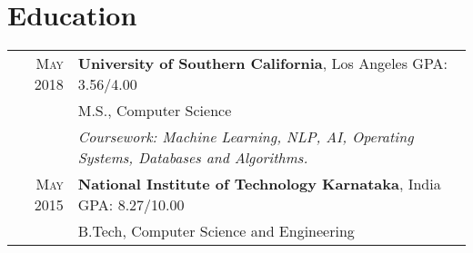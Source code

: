 \section{Education}
\begin{tabular}{rl}

\textsc{May 2018} & \textbf{University of Southern California}, Los Angeles  \hspace{5.0cm} GPA: 3.56/4.00\\
&M.S., Computer Science\\
& \textit{Coursework: Machine Learning, NLP, AI, Operating Systems, Databases and Algorithms.}
\vspace{10pt}
\\
\textsc{May 2015} & \textbf{National Institute of Technology Karnataka}, India \hspace{4.0cm} GPA: 8.27/10.00\\
&B.Tech, Computer Science and Engineering
\end{tabular}
